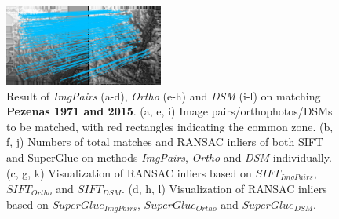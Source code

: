 \begin{figure}[htbp]
\begin{center}
{\begin{minipage}[t]{0.48\linewidth}
				\centering
				\includegraphics[width=5.2cm]{images/Chapitre3/Homol-SIFT2Step-Rough-2DRANSAC_MEC-Malt_Tapas_1971_MEC-Malt_2015.png}
			\end{minipage}%
		}
		\caption{{\scriptsize Result of \textit{ImgPairs} (a-d), \textit{Ortho} (e-h) and \textit{DSM} (i-l) on matching \textbf{Pezenas 1971 and 2015}. (a, e, i) Image pairs/orthophotos/DSMs to be matched, with red rectangles indicating the common zone. (b, f, j) Numbers of total matches and RANSAC inliers of both SIFT and SuperGlue on methods \textit{ImgPairs}, \textit{Ortho} and \textit{DSM} individually. (c, g, k) Visualization of RANSAC inliers based on $SIFT_{ImgPairs}$, $SIFT_{Ortho}$ and $SIFT_{DSM}$. (d, h, l) Visualization of RANSAC inliers based on $SuperGlue_{ImgPairs}$, $SuperGlue_{Ortho}$ and $SuperGlue_{DSM}$.}}        
		\label{MatchVizPezenas1971DSM}
	\end{center}
\end{figure} 



